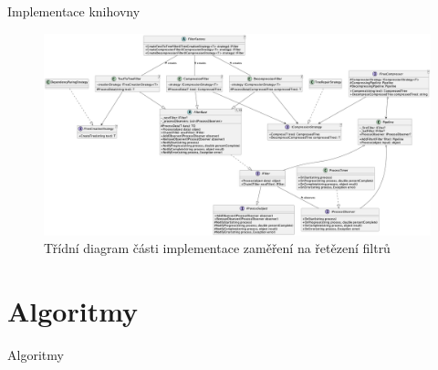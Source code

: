 \documentclass[lualatex,hyperref={pdfencoding=auto}]{beamer}
\begin{document}
\begin{frame}{Implementace knihovny}
    \begin{figure}
        \centering
        \includegraphics[width=\textwidth]{fig/class-diagram.png}
        \caption{Třídní diagram části implementace zaměření na řetězení filtrů}
        \label{fig:class-diagram}
    \end{figure}
\end{frame}

\section{Algoritmy}
\begin{frame}{Algoritmy}
  
  
\end{frame}
\end{document}
